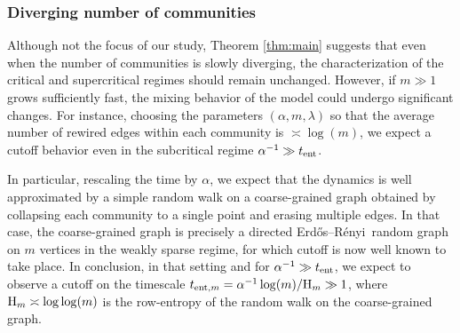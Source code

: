 \documentclass[11pt,oneside]{amsart}
\numberwithin{equation}{section}  %
\theoremstyle{plain}
\newcommand{\er}{Erdős–Rényi~}
\newcommand{\tent}{t_{\textup{ent}}}
\newcommand{\entropy}{\textup{H}}
\begin{document}
\subsubsection*{Diverging number of communities}
Although not the focus of our study, Theorem \ref{thm:main} suggests that even when the number of communities is slowly diverging, the characterization of the critical and supercritical regimes should remain unchanged.
However, if $m \gg1$ grows sufficiently fast, 
the mixing behavior of the model could undergo significant changes. 
For instance, choosing the parameters $(\alpha,m,\lambda)$ so that 
the average number of rewired edges within each community is $\asymp \log(m)$, we expect a cutoff behavior even in the subcritical regime $\alpha^{-1} \gg \tent$. 

In particular, rescaling the time by $\alpha$, we expect that the dynamics 
is well approximated by a simple random walk on a coarse-grained graph obtained by collapsing each community to a single point and erasing multiple edges. 
In that case, the coarse-grained graph is precisely a
directed \er random graph on $m$ vertices in the weakly sparse regime, 
for which cutoff is now well known to take place.
In conclusion, in that setting and for $\alpha^{-1} \gg \tent$, 
we expect to observe a cutoff  on the timescale $t_{{\rm ent}, m}=\alpha^{-1}\log(m)/\entropy_{m}\gg1$, where
$\entropy_{m} \asymp \log \log (m)$ is the row-entropy of the random walk on the coarse-grained graph.
\end{document}
